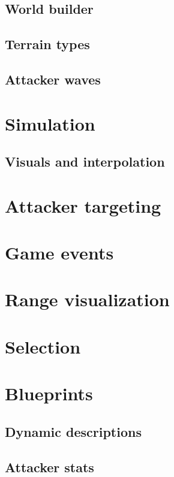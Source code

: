\subsection{World builder}

\subsection{Terrain types}

\subsection{Attacker waves}

\section{Simulation}

\subsection{Visuals and interpolation}

\section{Attacker targeting}

\section{Game events}

\section{Range visualization}

\section{Selection}

\section{Blueprints}

\subsection{Dynamic descriptions}

\subsection{Attacker stats}